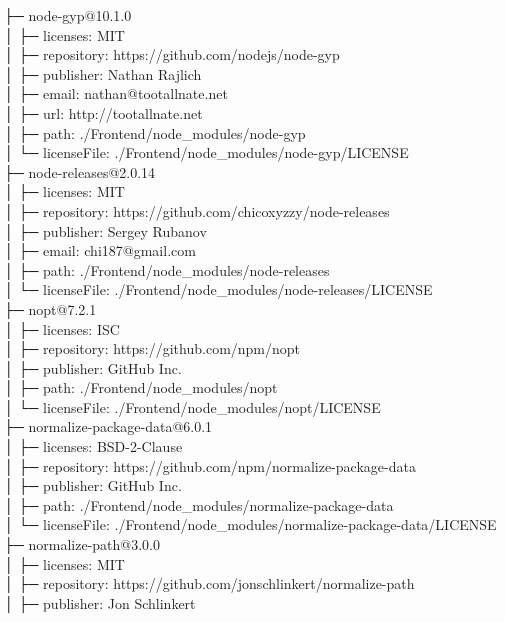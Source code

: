 \documentclass[
    paper=a4,
    twoside=false,
    parskip=half,
    listof=entryprefix,
    listof=totoc,
    index=totoc,
    bibliography=totoc,
    headsepline,
]{scrbook}
\begin{document}
    ├─ node-gyp@10.1.0\\
    │  ├─ licenses: MIT\\
    │  ├─ repository: https://github.com/nodejs/node-gyp\\
    │  ├─ publisher: Nathan Rajlich\\
    │  ├─ email: nathan@tootallnate.net\\
    │  ├─ url: http://tootallnate.net\\
    │  ├─ path: ./Frontend/node\_modules/node-gyp\\
    │  └─ licenseFile: ./Frontend/node\_modules/node-gyp/LICENSE\\
    ├─ node-releases@2.0.14\\
    │  ├─ licenses: MIT\\
    │  ├─ repository: https://github.com/chicoxyzzy/node-releases\\
    │  ├─ publisher: Sergey Rubanov\\
    │  ├─ email: chi187@gmail.com\\
    │  ├─ path: ./Frontend/node\_modules/node-releases\\
    │  └─ licenseFile: ./Frontend/node\_modules/node-releases/LICENSE\\
    ├─ nopt@7.2.1\\
    │  ├─ licenses: ISC\\
    │  ├─ repository: https://github.com/npm/nopt\\
    │  ├─ publisher: GitHub Inc.\\
    │  ├─ path: ./Frontend/node\_modules/nopt\\
    │  └─ licenseFile: ./Frontend/node\_modules/nopt/LICENSE\\
    ├─ normalize-package-data@6.0.1\\
    │  ├─ licenses: BSD-2-Clause\\
    │  ├─ repository: https://github.com/npm/normalize-package-data\\
    │  ├─ publisher: GitHub Inc.\\
    │  ├─ path: ./Frontend/node\_modules/normalize-package-data\\
    │  └─ licenseFile: ./Frontend/node\_modules/normalize-package-data/LICENSE\\
    ├─ normalize-path@3.0.0\\
    │  ├─ licenses: MIT\\
    │  ├─ repository: https://github.com/jonschlinkert/normalize-path\\
    │  ├─ publisher: Jon Schlinkert\\
\end{document}
